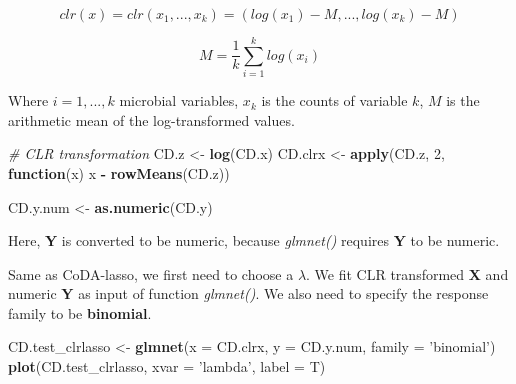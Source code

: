 \documentclass[openany]{book}
\newenvironment{Shaded}{\begin{snugshade}}{\end{snugshade}}
\newcommand{\KeywordTok}[1]{\textcolor[rgb]{0.13,0.29,0.53}{\textbf{#1}}}
\newcommand{\DataTypeTok}[1]{\textcolor[rgb]{0.13,0.29,0.53}{#1}}
\newcommand{\DecValTok}[1]{\textcolor[rgb]{0.00,0.00,0.81}{#1}}
\newcommand{\StringTok}[1]{\textcolor[rgb]{0.31,0.60,0.02}{#1}}
\newcommand{\CommentTok}[1]{\textcolor[rgb]{0.56,0.35,0.01}{\textit{#1}}}
\newcommand{\ControlFlowTok}[1]{\textcolor[rgb]{0.13,0.29,0.53}{\textbf{#1}}}
\newcommand{\OperatorTok}[1]{\textcolor[rgb]{0.81,0.36,0.00}{\textbf{#1}}}
\newcommand{\NormalTok}[1]{#1}
\begin{document}
\[clr(x) = clr(x_{1},...,x_{k}) = (log(x_{1})-M,...,log(x_{k})-M)\]

\[M = \frac{1}{k}\sum_{i=1}^{k}log(x_{i})\]

Where \(i=1,...,k\) microbial variables, \(x_{k}\) is the counts of
variable \(k\), \(M\) is the arithmetic mean of the log-transformed
values.

\begin{Shaded}
\begin{Highlighting}[]
\CommentTok{# CLR transformation}
\NormalTok{CD.z <-}\StringTok{ }\KeywordTok{log}\NormalTok{(CD.x)}
\NormalTok{CD.clrx <-}\StringTok{ }\KeywordTok{apply}\NormalTok{(CD.z, }\DecValTok{2}\NormalTok{, }\ControlFlowTok{function}\NormalTok{(x) x }\OperatorTok{-}\StringTok{ }\KeywordTok{rowMeans}\NormalTok{(CD.z))}
\end{Highlighting}
\end{Shaded}

\begin{Shaded}
\begin{Highlighting}[]
\NormalTok{CD.y.num <-}\StringTok{ }\KeywordTok{as.numeric}\NormalTok{(CD.y)}
\end{Highlighting}
\end{Shaded}

Here, \textbf{Y} is converted to be numeric, because \emph{glmnet()}
requires \textbf{Y} to be numeric.

Same as CoDA-lasso, we first need to choose a \(\lambda\). We fit CLR
transformed \textbf{X} and numeric \textbf{Y} as input of function
\emph{glmnet()}. We also need to specify the response family to be
\textbf{binomial}.

\begin{Shaded}
\begin{Highlighting}[]
\NormalTok{CD.test_clrlasso <-}\StringTok{ }\KeywordTok{glmnet}\NormalTok{(}\DataTypeTok{x =}\NormalTok{ CD.clrx, }\DataTypeTok{y =}\NormalTok{ CD.y.num, }\DataTypeTok{family =} \StringTok{'binomial'}\NormalTok{)}
\KeywordTok{plot}\NormalTok{(CD.test_clrlasso, }\DataTypeTok{xvar =} \StringTok{'lambda'}\NormalTok{, }\DataTypeTok{label =}\NormalTok{ T)}
\end{Highlighting}
\end{Shaded}
\end{document}
